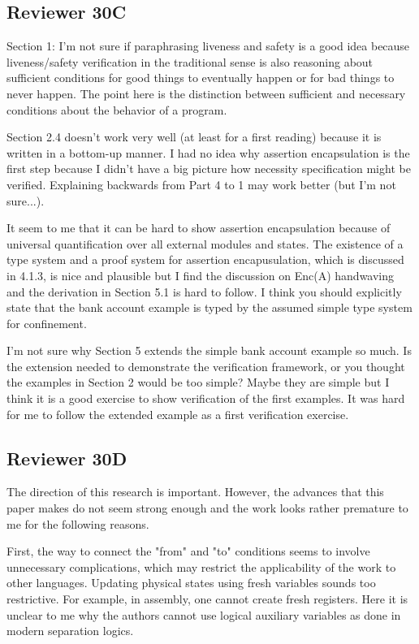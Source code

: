 \documentclass[11pt]{amsart}
\begin{document}
 
  \subsection*{Reviewer 30C}
  

Section 1: I'm not sure if paraphrasing liveness and safety is a good
idea because liveness/safety verification in the traditional sense is
also reasoning about sufficient conditions for good things to
eventually happen or for bad things to never happen.  The point
here is the distinction between sufficient and necessary conditions
about the behavior of a program.

Section 2.4 doesn't work very well (at least for a first reading)
because it is written in a bottom-up manner.  I had no idea why
assertion encapsulation is the first step because I didn't have a big
picture how necessity specification might be verified.  Explaining backwards from Part 4 to 1
may work better (but I'm not sure...).

It seem to me that it can be hard to show assertion encapsulation
because of universal quantification over all external modules and
states.  The existence of a type system and a proof system for
assertion encapusulation, which is discussed in 4.1.3, is nice and
plausible but I find the discussion on Enc(A) handwaving and the
derivation in Section 5.1 is hard to follow.  I think you should
explicitly state that the bank account example is typed by the assumed
simple type system for confinement.

I'm not sure why Section 5 extends the simple bank account example so
much.  Is the extension needed to demonstrate the verification
framework, or you thought the examples in Section 2 would be too simple? 
Maybe they are simple but I think it is a good exercise to show verification of the first examples. 
It was hard for me to follow the extended example as a first verification exercise.

 \subsection*{Reviewer 30D}
 
The direction of this research is important. However, the advances that this paper makes do not seem strong enough and the work looks rather premature to me for the following reasons.

First, the way to connect the "from" and "to" conditions seems to involve unnecessary complications, which may restrict the applicability of the work to other languages. Updating physical states using fresh variables sounds too restrictive. For example, in assembly, one cannot create fresh registers. Here it is unclear to me why the authors cannot use logical auxiliary variables as done in modern separation logics.
\end{document}
